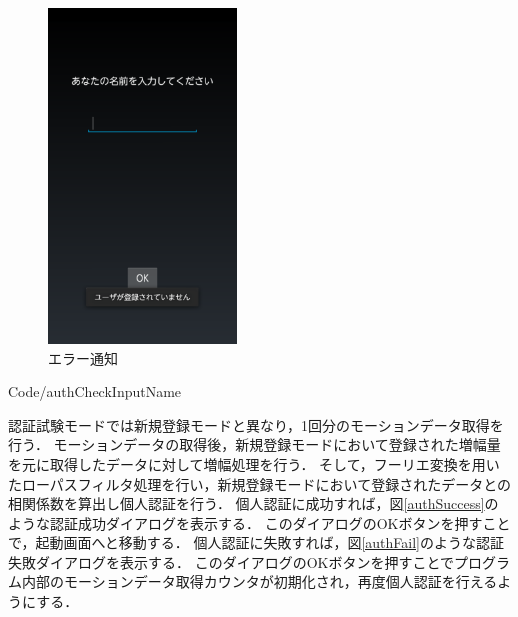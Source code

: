 \documentclass[12pt]{jreport}
\renewcommand{\slash}{/}
\begin{document}
\begin{figure}[htbp]
            \begin{minipage}{0.32\hsize}
                \begin{center}
                    \includegraphics[width=5cm, bb=0 0 540 960]{AuthNameInputError.pdf}
                \end{center}
                \caption{エラー通知}
                \label{authNameInputError}
            \end{minipage}
        \end{figure}

        
        {Code\slash authCheckInputName}

        認証試験モードでは新規登録モードと異なり，1回分のモーションデータ取得を行う．
        モーションデータの取得後，新規登録モードにおいて登録された増幅量を元に取得したデータに対して増幅処理を行う．
        そして，フーリエ変換を用いたローパスフィルタ処理を行い，新規登録モードにおいて登録されたデータとの相関係数を算出し個人認証を行う．
        個人認証に成功すれば，図\ref{authSuccess}のような認証成功ダイアログを表示する．
        このダイアログのOKボタンを押すことで，起動画面へと移動する．
        個人認証に失敗すれば，図\ref{authFail}のような認証失敗ダイアログを表示する．
        このダイアログのOKボタンを押すことでプログラム内部のモーションデータ取得カウンタが初期化され，再度個人認証を行えるようにする．
\end{document}
